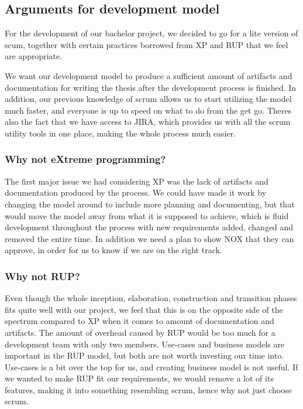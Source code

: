\subsection{Arguments for development model}
For the development of our bachelor project, we decided to go for a lite version of scum, together with certain practices borrowed from XP and RUP that we feel are appropriate.


We want our development model to produce a sufficient amount of artifacts and documentation for writing the thesis after the development process is finished.
In addition, our previous knowledge of scrum allows us to start utilizing the model much faster, and everyone is up to speed on what to do from the get go.
Theres also the fact that we have access to JIRA, which provides us with all the scrum utility tools in one place, making the whole process much easier.


\subsubsection*{Why not eXtreme programming?}

The first major issue we had considering XP was the lack of artifacts and documentation produced by the process.
We could have made it work by changing the model around to include more planning and documenting, but that would move the model away from what it is supposed to achieve, which is fluid development throughout the process with new requirements added, changed and removed the entire time.
In addition we need a plan to show NOX that they can approve, in order for us to know if we are on the right track.


\subsubsection*{Why not RUP?}

Even though the whole inception, elaboration, construction and transition phases fits quite well with our project, we feel that this is on the opposite side of the spectrum compared to XP when it comes to amount of documentation and artifacts. 
The amount of overhead caused by RUP would be too much for a development team with only two members.
Use-cases and business models are important in the RUP model, but both are not worth investing our time into.
Use-cases is a bit over the top for us, and creating business model is not useful.
If we wanted to make RUP fit our requirements, we would remove a lot of its features, making it into something resembling scrum, hence why not just choose scrum.


